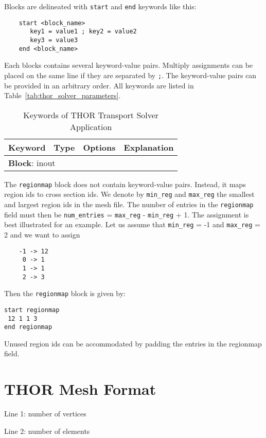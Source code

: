 Blocks are delineated with \verb"start" and \verb"end" keywords like this:
\begin{verbatim}
    start <block_name>
       key1 = value1 ; key2 = value2
       key3 = value3
    end <block_name>
\end{verbatim}
Each blocks contains several keyword-value pairs. Multiply assignments can be placed on the same
line if they are separated by \verb";".
The keyword-value pairs can be provided in an arbitrary order.
All keywords are listed in Table~\ref{tab:thor_solver_parameters}.

\begin{table}[p]
    \centering
    \caption{Keywords of THOR Transport Solver Application\label{tab:thor_solver_parameters_2}}
    \begin{tabular}{l l l l}
        \toprule
        Keyword & Type & Options & Explanation\\
        \midrule
        \multicolumn{4}{l}{\textbf{Block}: inout}\\
        \bottomrule
    \end{tabular}
\end{table}

The \verb"regionmap" block does not contain keyword-value pairs. Instead, it maps region ids to cross section ids. We denote by
\verb"min_reg" and \verb"max_reg" the smallest and largest region ids in the mesh file. The number of entries in the \verb"regionmap"
field must then be \verb"num_entries" = \verb"max_reg" - \verb"min_reg" + 1. The assignment is best illustrated for an example.
Let us assume that \verb"min_reg" = -1 and \verb"max_reg" = 2 and we want to assign
\begin{verbatim}
    -1 -> 12
     0 -> 1
     1 -> 1
     2 -> 3
\end{verbatim}
Then the \verb"regionmap" block is given by:
\begin{verbatim}
start regionmap
 12 1 1 3
end regionmap
\end{verbatim}
Unused region ids can be accommodated by padding the entries in the regionmap field.

\section{THOR Mesh Format}\label{ch:inp:sec:meshfile}
Line 1: number of vertices
\vspace{2mm}

\noindent Line 2: number of elements
\vspace{2mm}

